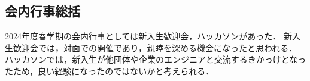 \subsection*{会内行事総括}


2024年度春学期の会内行事としては新入生歓迎会，ハッカソンがあった．
新入生歓迎会では，対面での開催であり，親睦を深める機会になったと思われる．
ハッカソンでは，新入生が他団体や企業のエンジニアと交流するきかっけとなったため，良い経験になったのではないかと考えられる．

